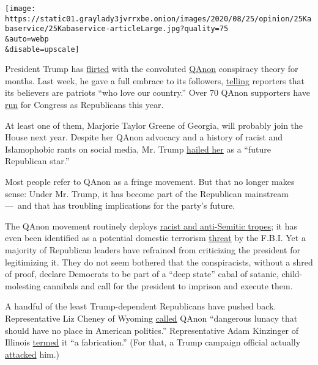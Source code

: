 \texttt{[image: https://static01.graylady3jvrrxbe.onion/images/2020/08/25/opinion/25Kabaservice/25Kabaservice-articleLarge.jpg?quality=75\\\&auto=webp\\\&disable=upscale]}

President Trump has
\href{https://www.mediamatters.org/twitter/fbi-calls-qanon-domestic-terror-threat-trump-has-amplified-qanon-supporters-twitter-more-20}{flirted}
with the convoluted
\href{https://www.nytimes3xbfgragh.onion/2020/08/13/technology/qanon-tea-party.html}{QAnon}
conspiracy theory for months. Last week, he gave a full embrace to its
followers,
\href{https://www.nytimes3xbfgragh.onion/2020/08/19/us/politics/trump-qanon-conspiracy-theories.html}{telling}
reporters that its believers are patriots ``who love our country.'' Over
70 QAnon supporters have
\href{https://www.mediamatters.org/qanon-conspiracy-theory/here-are-qanon-supporters-running-congress-2020}{run}
for Congress as Republicans this year.

At least one of them, Marjorie Taylor Greene of Georgia, will probably
join the House next year. Despite her QAnon advocacy and a history of
racist and Islamophobic rants on social media, Mr. Trump
\href{https://www.mcclatchydc.com/news/politics-government/article244904722.html}{hailed
her} as a ``future Republican star.''

Most people refer to QAnon as a fringe movement. But that no longer
makes sense: Under Mr. Trump, it has become part of the Republican
mainstream ---~and that has troubling implications for the party's
future.

The QAnon movement routinely deploys
\href{https://forward.com/news/national/451647/just-how-anti-semitic-is-qanon/}{racist
and anti-Semitic tropes}; it has even been identified as a potential
domestic terrorism
\href{https://www.thedailybeast.com/fbi-warns-against-qanon-pizzagate-in-report-highlighting-dangers-of-fringe-conspiracy-theories}{threat}
by the F.B.I. Yet a majority of Republican leaders have refrained from
criticizing the president for legitimizing it. They do not seem bothered
that the conspiracists, without a shred of proof, declare Democrats to
be part of a ``deep state'' cabal of satanic, child-molesting cannibals
and call for the president to imprison and execute them.

A handful of the least Trump-dependent Republicans have pushed back.
Representative Liz Cheney of Wyoming
\href{https://www.axios.com/liz-cheney-qanon-republican-dangerous-lunacy-23c2b455-7b3a-4199-9a0e-1176682492b0.html}{called}
QAnon ``dangerous lunacy that should have no place in American
politics.'' Representative Adam Kinzinger of Illinois
\href{https://www.newsbreak.com/news/2042901802796/rep-kinzinger-warns-against-qanon-fabrication}{termed}
it ``a fabrication.'' (For that, a Trump campaign official actually
\href{https://www.forbes.com/sites/andrewsolender/2020/08/12/top-trump-campaign-staffer-slams-gop-congressman-for-calling-qanon-a-fabrication/\#687a474c31a0}{attacked}
him.)

